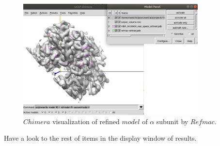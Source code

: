 \begin{itemize}
  \begin{figure}[H]
  \centering 
  \captionsetup{width=.7\linewidth} 
  \includegraphics[width=0.85\textwidth]{Images/Fig33.png}
  \caption{$Chimera$ visualization of refined $model$ of  $\alpha$ subunit by $Refmac$.}
  \label{fig:refmac_chimera}
  \end{figure}
  
  Have a look to the rest of items in the display window of results. 
  
  \end{itemize}
